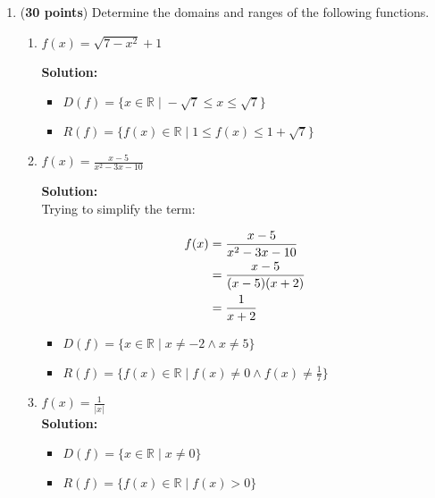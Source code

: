 \documentclass[a4paper]{article}
\begin{document}
\begin{enumerate}
\item (\textbf{30 points}) Determine the domains and ranges of the following functions.

\begin{enumerate}
	\item $f(x) = \sqrt{7-x^2} + 1$
	
	\textbf{Solution:}\\
	
\begin{itemize}
	\item $D(f) = \{x \in \mathbb{R} \;|\; - \sqrt{7} \leq x \leq \sqrt{7}\}$\\ 
	\item $R(f) = \{ f(x) \in \mathbb{R} \;|\; 1 \leq f(x) \leq 1 + \sqrt{7}\}$
\end{itemize}\vspace{1em}		
	
	
	
	
	\item $f(x) = \frac{x-5}{x^2-3x-10}$
	
	\textbf{Solution:}\\
	
	Trying to simplify the term:

\begin{align*}
	f(x) &= \frac{x-5}{x^2-3x-10}\notag\\
	&= \frac{x-5}{(x-5)(x+2)}\notag\\
	&= \frac{1}{x+2}\notag
\end{align*}	
	
\begin{itemize}
	\item $D(f) = \{x \in \mathbb{R} \;|\; x \neq -2 \wedge x \neq 5 \}$\\ 
	\item $R(f) = \{ f(x) \in \mathbb{R} \;|\; f(x) \neq 0 \wedge f(x) \neq \frac{1}{7} \}$ \\
\end{itemize}	
	
	
	\item $f(x) = \frac{1}{|x|}$\\
	\textbf{Solution:}\\
	
	\begin{itemize}
	\item $D(f) = \{x \in \mathbb{R} \;|\; x \neq 0\}$ \\ 
	\item $R(f) = \{ f(x) \in \mathbb{R} \;|\; f(x) > 0\}$\\
\end{itemize}	
	

\end{enumerate}
\end{enumerate}
\end{document}
